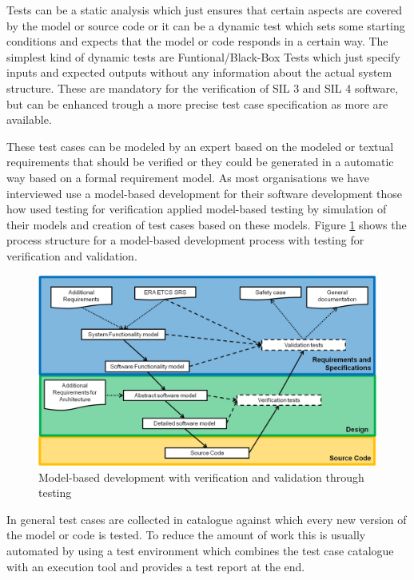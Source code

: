 \documentclass{./template/openetcs2}
\begin{document}
Tests can be a static analysis which just ensures that certain aspects are covered by the model or source code or it can be a dynamic test which sets some starting conditions and expects that the model or code  responds in a certain way. The simplest kind of dynamic tests are Funtional/Black-Box Tests which just specify inputs and expected outputs without any information about the  actual system structure. These are mandatory for the verification of SIL 3 and SIL 4 software, but can be enhanced trough a more precise test case specification as more are available.

These test cases can be modeled by an expert based on the modeled or textual requirements that should be verified or they could be generated in a automatic way based on a formal requirement model. As most organisations we have interviewed use a model-based development for their software development those how used testing for verification applied model-based testing by simulation of their models and creation of test cases based on these models. Figure \ref{fig: MBD-Testing} shows the process structure for a model-based development process with testing for verification and validation.

\begin{figure}[h]
\centering
\includegraphics[scale=0.6]{Lifecycle-Model-based-Approach-Testing.png}
\caption{Model-based development with verification and validation through testing}
\label{fig: MBD-Testing}
\end{figure}

In general test cases are collected in catalogue against which every new version of the model or code is tested. To reduce the amount of work this is usually automated by using a test environment which combines the test case catalogue with an execution tool and provides a test report at the end.
\end{document}
